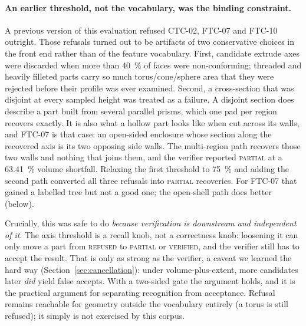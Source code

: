 \documentclass[11pt]{article}
\newcommand{\VERIFIED}{\textsc{verified}}
\newcommand{\PARTIAL}{\textsc{partial}}
\newcommand{\REFUSED}{\textsc{refused}}
\begin{document}
\paragraph{An earlier threshold, not the vocabulary, was the binding
constraint.} A previous version of this evaluation refused CTC-02, FTC-07 and
FTC-10 outright. Those refusals turned out to be artifacts of two conservative
choices in the front end rather than of the feature vocabulary. First, candidate
extrude axes were discarded when more than \SI{40}{\percent} of faces were
non-conforming; threaded and heavily filleted parts carry so much
torus/cone/sphere area that they were rejected before their profile was ever
examined. Second, a cross-section that was disjoint at every sampled height was
treated as a failure. A disjoint section does describe a part built from several
parallel prisms, which one pad per region recovers exactly. It is also what a
hollow part looks like when cut across its walls, and FTC-07 is that case: an
open-sided enclosure whose section along the recovered axis is its two opposing
side walls. The multi-region path recovers those two walls and nothing that
joins them, and the verifier reported \PARTIAL{} at a \SI{63.41}{\percent} volume
shortfall. Relaxing the first threshold to \SI{75}{\percent} and adding the second
path converted all three refusals into \PARTIAL{} recoveries. For FTC-07 that
gained a labelled tree but not a good one; the open-shell path does better
(below).

Crucially, this was safe to do \emph{because verification is downstream and
independent of it}. The axis threshold is a recall knob, not a correctness knob:
loosening it can only move a part from \REFUSED{} to \PARTIAL{} or \VERIFIED{},
and the verifier still has to accept the result. That is only as strong as the
verifier, a caveat we learned the hard way (Section~\ref{sec:cancellation}): under
volume-plus-extent, more candidates later \emph{did} yield false accepts. With a
two-sided gate the argument holds, and it is the practical argument for
separating recognition from acceptance. Refusal remains reachable for geometry
outside the vocabulary
entirely (a torus is still refused); it simply is not exercised by this corpus.
\end{document}
